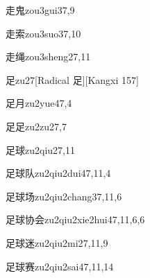 \begin{verbete}{走鬼}{zou3gui3}{7,9}
\end{verbete}

\begin{verbete}{走索}{zou3suo3}{7,10}
\end{verbete}

\begin{verbete}{走绳}{zou3sheng2}{7,11}
\end{verbete}

\begin{verbete}{足}{zu2}{7}[Radical 足][Kangxi 157]
\end{verbete}

\begin{verbete}{足月}{zu2yue4}{7,4}
\end{verbete}

\begin{verbete}{足足}{zu2zu2}{7,7}
\end{verbete}

\begin{verbete}{足球}{zu2qiu2}{7,11}
\end{verbete}

\begin{verbete}{足球队}{zu2qiu2dui4}{7,11,4}
\end{verbete}

\begin{verbete}{足球场}{zu2qiu2chang3}{7,11,6}
\end{verbete}

\begin{verbete}{足球协会}{zu2qiu2xie2hui4}{7,11,6,6}
\end{verbete}

\begin{verbete}{足球迷}{zu2qiu2mi2}{7,11,9}
\end{verbete}

\begin{verbete}{足球赛}{zu2qiu2sai4}{7,11,14}
\end{verbete}

